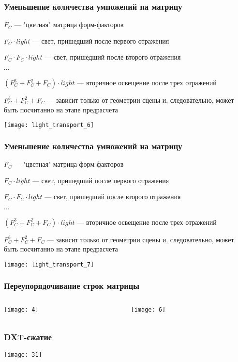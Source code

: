 \documentclass[unicode, dvipsnames]{beamer}
\begin{document}
\begin{frame}
	\frametitle{Уменьшение количества умножений на матрицу}
	$F_C$ --- "цветная" матрица форм-факторов
	
	$F_C \cdot light$ --- свет, пришедший после первого отражения

	$F_C \cdot F_C \cdot light$ --- свет, пришедший после второго отражения
	
	$\cdots$
	
	$(F_C^3 + F_C^2 + F_C) \cdot light$ --- вторичное освещение после трех отражений
	
	$F_C^3 + F_C^2 + F_C$ --- зависит только от геометрии сцены и, следовательно, может быть посчитанно на этапе предрасчета
	
	\center
	\texttt{[image: light\_transport\_6]}
\end{frame}

\begin{frame}
	\frametitle{Уменьшение количества умножений на матрицу}
	$F_C$ --- "цветная" матрица форм-факторов
	
	$F_C \cdot light$ --- свет, пришедший после первого отражения

	$F_C \cdot F_C \cdot light$ --- свет, пришедший после второго отражения
	
	$\cdots$
	
	$(F_C^3 + F_C^2 + F_C) \cdot light$ --- вторичное освещение после трех отражений
	
	$F_C^3 + F_C^2 + F_C$ --- зависит только от геометрии сцены и, следовательно, может быть посчитанно на этапе предрасчета
	
	\center
	\texttt{[image: light\_transport\_7]}
\end{frame}

\begin{frame}
	\frametitle{Переупорядочивание строк матрицы}
	\begin{columns}[T]
    	\begin{column}[T]{5cm}
			\texttt{[image: 4]}
    	\end{column}
    	\begin{column}[T]{5cm}
			\texttt{[image: 6]}
	    \end{column}
    \end{columns}
\end{frame}

\begin{frame}
	\frametitle{DXT-сжатие}
	\texttt{[image: 31]}
\end{frame}
\end{document}
